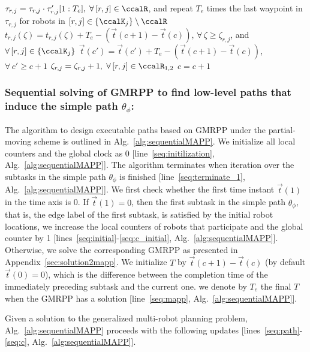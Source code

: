\documentclass[Afour,sageh,times]{sagej}
\begin{document}
{{\begin{algorithm}[!t]
{{            $\tau_{r,j} = \tau_{r,j} \cdot \tau'_{r,j}[1:T_e], \;\forall \,[r,j] \in \ccalR $, and repeat  $T_e$ times  the last waypoint in $\tau_{r,j}$ for robots in $[r,j] \in \{\ccalK_j\} \setminus \ccalR$ \label{seq:path}\;
            $t_{r,j}(\zeta) =  t_{r,j}(\zeta)  + T_e - (\vec{t}(c+1) - \vec{t}(c))$, $\forall \,\zeta \geq  \zeta_{r,j}$, and $ \forall\, [r,j] \in \{\ccalK_j\} $ \label{seq:timeline} \;
            $\vec{t}(c') = \vec{t}(c') + T_e - (\vec{t}(c+1) - \vec{t}(c))$, $ \forall \, c' \geq c+1$  \label{seq:axis}\;
            $\zeta_{r,j} = \zeta_{r,j} + 1, \; \forall \, [r,j] \in \ccalR_{1,2}$ \label{seq:counter}\;
            $c = c + 1$ \label{seq:c}\;

        }
      }
\end{algorithm}}

 \subsubsection{Sequential solving of  GMRPP to find low-level paths that induce the simple path $\theta_{\phi}$:}
 The algorithm to design executable paths based on GMRPP under the  partial-moving scheme is outlined in Alg.~\ref{alg:sequentialMAPP}.  We initialize all local counters and the global clock as 0 [line~\ref{seq:initilization}, Alg.~\ref{alg:sequentialMAPP}]. The algorithm  terminates when iteration over  the subtasks in the simple path $\theta_{\phi}$ is finished [line~\ref{seq:terminate_1}, Alg.~\ref{alg:sequentialMAPP}].  We first check whether the first time instant $\vec{t}(1)$ in the time axis is 0. If $\vec{t}(1)=0$, then the first subtask in the simple path $\theta_{\phi}$, that is, the edge label of the first subtask, is satisfied by the initial robot locations, we increase the local counters of robots that participate and the global counter by 1 [lines~\ref{seq:initial}-\ref{seq:c_initial}, Alg.~\ref{alg:sequentialMAPP}]. Otherwise, we solve the corresponding GMRPP as presented in Appendix~\ref{sec:solution2mapp}.  We initialize $T$ by $\vec{t}(c+1) - \vec{t}(c)$ (by default $\vec{t}(0)=0$),  which is the difference between the completion time of the immediately preceding subtask and the current one. %
we denote by $T_e$  the final $T$  when  the GMRPP has a solution [line~\ref{seq:mapp}, Alg.~\ref{alg:sequentialMAPP}]. {Given a solution to the generalized multi-robot planning problem, Alg.~\ref{alg:sequentialMAPP} proceeds with the following updates [lines~\ref{seq:path}-\ref{seq:c}, Alg.~\ref{alg:sequentialMAPP}].

}}
\end{document}
